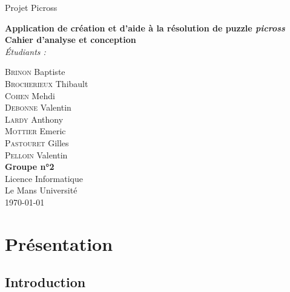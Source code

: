 \documentclass{report}
\begin{document}
\begin{titlepage}
	\begin{center}
	
		\begin{spacing}{1.5}
			Projet Picross\\
			\vspace*{\fill}
		\end{spacing}
		
		\begin{spacing}{2.5}
			\textbf{\Huge Application de création et d'aide à la résolution de puzzle \textit{picross}}\\[0.5cm]
			\textbf{\huge Cahier d'analyse et conception} \\
			\vspace*{\fill}
			\textit{Étudiants :}
		\end{spacing}

		\begin{spacing}{1.15}
			\large
			\textsc{Brinon} Baptiste\\
			\textsc{Brocherieux} Thibault\\
			\textsc{Cohen} Mehdi\\
			\textsc{Debonne} Valentin\\
			\textsc{Lardy} Anthony\\
			\textsc{Mottier} Emeric\\
			\textsc{Pastouret} Gilles\\
			\textsc{Pelloin} Valentin\\
			\vspace*{\fill}
			\textbf{Groupe n°2} \\
			\textnormal{\large Licence Informatique\\ Le Mans Université\\ \today}
		\end{spacing}
		
	\end{center}
\end{titlepage}


\renewcommand{\contentsname}{Sommaire}
\tableofcontents


\chapter{Présentation}

	\section{Introduction}
\end{document}
